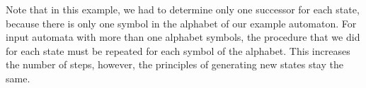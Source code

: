 Note that in this example, we had to determine only one successor for each state, because there is only one symbol in the alphabet of our example automaton. For input automata with more than one alphabet symbols, the procedure that we did for each state must be repeated for each symbol of the alphabet. This increases the number of steps, however, the principles of generating new states stay the same.











